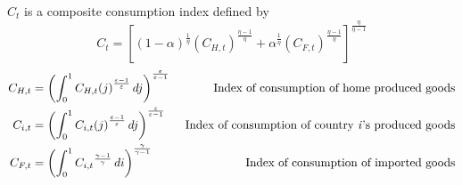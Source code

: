 \documentclass[12pt]{article}
\begin{document}
$C_t$ is a composite consumption index defined by
\begin{equation}
    C_t = \left[ (1-\alpha)^\frac{1}{\eta} (C_{H,t})^{\frac{\eta-1}{\eta}} + \alpha^{\frac{1}{\eta}}(C_{F,t})^{\frac{\eta-1}{\eta}}\right]^{\frac{\eta}{\eta-1}}
\end{equation}
\begin{align}
    C_{H,t} & = \left( \int_{0}^{1} {C_{H,t}(j)}^{\frac{\varepsilon-1}{\varepsilon}} \,dj  \right)^\frac{\varepsilon}{\varepsilon-1} & \text{ Index of consumption of home produced goods}                 \\
    C_{i,t} & = \left( \int_{0}^{1} {C_{i,t}(j)}^{\frac{\varepsilon-1}{\varepsilon}} \,dj  \right)^\frac{\varepsilon}{\varepsilon-1} & \text{ Index of consumption of country \textit{i}'s produced goods} \\
    C_{F,t} & = \left( \int_{0}^{1} {C_{i,t}}^{\frac{\gamma-1}{\gamma}} \,di  \right)^{\frac{\gamma}{\gamma-1}}                      & \text{ Index of consumption of imported goods}
\end{align}
\end{document}
